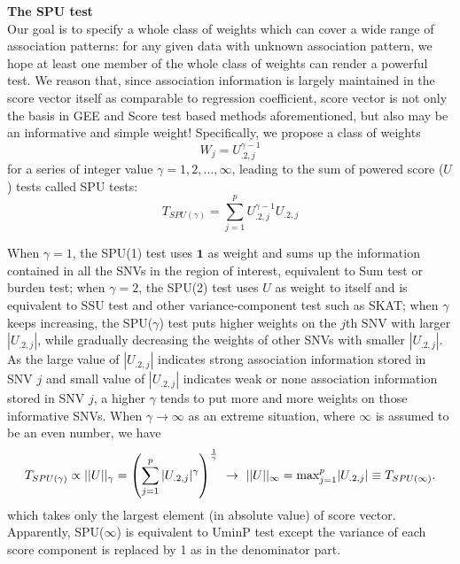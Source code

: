 \documentclass[12pt]{article}
\begin{document}
\textbf{The SPU test}\\
Our goal is to specify a whole class of weights which can cover a wide range of association patterns: for any given data with unknown association pattern, we hope at least one member of the whole class of weights can render a powerful test. We reason that, since association information is largely maintained in the score vector itself as comparable to regression coefficient, score vector is not only the basis in GEE and Score test based methods aforementioned, but also may be an informative and simple weight! Specifically, we propose a class of weights 
$$W_j = U_{.2, j} ^ { \gamma - 1} $$
for a series of integer value $\gamma = 1,2,\ldots,\infty$, leading to the sum of powered score ($U$) tests called SPU tests:
$$
T_{ SPU ( \gamma ) } = \sum_{j=1}^p U_{.2, j} ^ { \gamma - 1} U_{.2, j}
$$

When $\gamma = 1$, the SPU(1) test uses $\textbf{1}$ as weight and sums up the information contained in all the SNVs in the region of interest, equivalent to Sum test or burden test; when $\gamma = 2$, the SPU(2) test uses $U$ as weight to itself and is equivalent to SSU test and other variance-component test such as SKAT; when $\gamma$ keeps increasing, the SPU($\gamma$) test puts higher weights on the $j$th SNV with larger $|U_{.2,j}|$, while gradually decreasing the weights of other SNVs with smaller $|U_{.2,j}|$. As the large value of $|U_{.2,j}|$ indicates strong association information stored in SNV $j$ and small value of $|U_{.2,j}|$ indicates weak or none association information stored in SNV $j$, a higher $\gamma$ tends to put more and more weights on those informative SNVs. When $\gamma \rightarrow \infty$ as an extreme situation, where $\infty$ is assumed to be an even number, we have
$$
T_{ SPU(\gamma) } \propto ||U||_{\gamma} = \left( \sum_{j=1}^p |U_{.2, j}| ^ { \gamma } \right) ^ { 1 \over \gamma } \ \rightarrow \ ||U||_{\infty} = \textrm{max}_{j=1} ^ p |U_{.2, j}| \equiv T_{ SPU(\infty) }.
$$ 
which takes only the largest element (in absolute value) of score vector. Apparently, SPU($\infty$) is equivalent to UminP test except the variance of each score component is replaced by 1 as in the denominator part.
\end{document}
